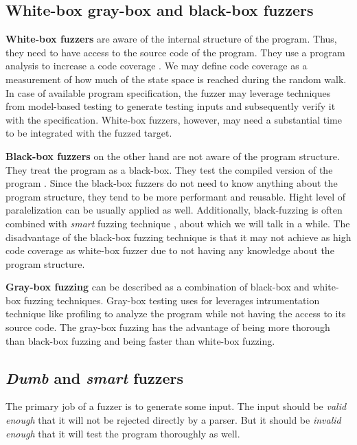 \subsection{White-box gray-box and black-box fuzzers}
\label{ssub:White-box gray-box and black-box fuzzers}
\textbf{White-box fuzzers} are aware of the internal structure of the program. Thus, they need to have access to the source code of the program. They use a program analysis to increase a code coverage \cite{neystadt2008automated}. We may define code coverage as a measurement of how much of the state space is reached during the random walk. In case of available program specification, the fuzzer may leverage techniques from model-based testing to generate testing  inputs and subsequently verify it with the specification. White-box fuzzers, however, may need a substantial time to be integrated with the fuzzed target.

\textbf{Black-box fuzzers} on the other hand are not aware of the program structure. They treat the program as a black-box. They test the compiled version of the program \cite{takanen2018fuzzing}. Since the black-box fuzzers do not need to know anything about the program structure, they tend to be more performant and reusable. Hight level of paralelization can be usually applied as well. Additionally, black-fuzzing is often combined with \emph{smart} fuzzing technique \cite{neystadt2008automated}, about which we will talk in a while. The disadvantage of the black-box fuzzing technique is that it may not achieve as high code coverage as white-box fuzzer due to not having any knowledge about the program structure.

\textbf{Gray-box fuzzing} can be described as a combination of black-box and white-box fuzzing techniques. Gray-box testing uses for leverages intrumentation technique like profiling to analyze the program while not having the access to its source code. The gray-box fuzzing has the advantage of being more thorough than black-box fuzzing and being faster than white-box fuzzing.


\subsection{\emph{Dumb} and \emph{smart} fuzzers}
\label{ssub:Dumb and smart fuzzers}
The primary job of a fuzzer is to generate some input. The input should be \emph{valid enough} that it will not be rejected directly by a parser. But it should be \emph{invalid enough} that it will test the program thoroughly as well.


